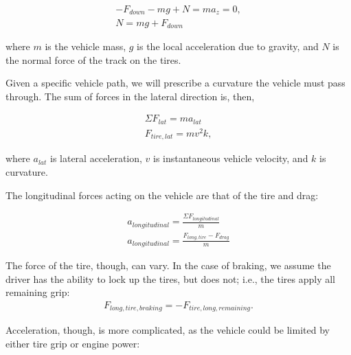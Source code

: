 \documentclass{article}
\begin{document}
\begin{align}
    -F_{down} -m g + N = m a_{z} = 0, \\
    N = m g + F_{down} \label{eq_z}
\end{align}

where $m$ is the vehicle mass, $g$ is the local acceleration due to gravity, and $N$ is the normal force of the track on the tires.

Given a specific vehicle path, we will prescribe a curvature the vehicle must pass through. The sum of forces in the lateral direction is, then,

\begin{align}
    \Sigma F_{lat} = m a_{lat} \\
    F_{tire,lat} = m v^2 k, \label{eq_lateral}
\end{align}

where $a_{lat}$ is lateral acceleration, $v$ is instantaneous vehicle velocity, and $k$ is curvature.


%

The longitudinal forces acting on the vehicle are that of the tire and drag:

\begin{align}
    a_{longitudinal} = \frac{\Sigma F_{longitudinal}}{m}\\
    a_{longitudinal} = \frac{F_{long,tire} - F_{drag} }{m} \label{eq_accel}
\end{align}

The force of the tire, though, can vary. In the case of braking, we assume the driver has the ability to lock up the tires, but does not; i.e., the tires apply all remaining grip: 
\begin{align}
F_{long,tire,braking} = -F_{tire,long,remaining}. \label{eq_accel_brake}
\end{align}

Acceleration, though, is more complicated, as the vehicle could be limited by either tire grip or engine power:
\end{document}
